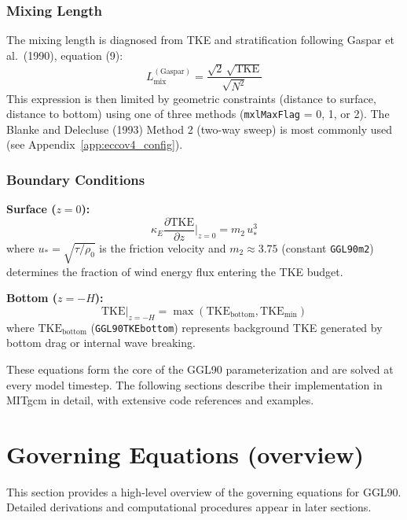 \documentclass[12pt,letterpaper]{article}
\newcommand{\TKE}{\mathrm{TKE}}
\newcommand{\KE}{\kappa_E}
\newcommand{\Lmix}{L_{\mathrm{mix}}}
\begin{document}
\subsubsection{Mixing Length}

The mixing length is diagnosed from TKE and stratification following Gaspar
et al.\ (1990), equation (9):
\begin{equation}
\Lmix^{\mathrm{(Gaspar)}} = \frac{\sqrt{2} \, \sqrt{\TKE}}{\sqrt{N^2}}
\label{eq:l_gaspar}
\end{equation}
This expression is then limited by geometric constraints (distance to surface,
distance to bottom) using one of three methods (\texttt{mxlMaxFlag} = 0, 1, or 2).
The Blanke and Delecluse (1993) Method 2 (two-way sweep) is most commonly used
(see Appendix~\ref{app:eccov4_config}).

\subsubsection{Boundary Conditions}

\textbf{Surface ($z = 0$):}
\begin{equation}
\KE \frac{\partial \TKE}{\partial z}\bigg|_{z=0} = m_2 \, u_*^3
\label{eq:bc_surface}
\end{equation}
where $u_* = \sqrt{\tau / \rho_0}$ is the friction velocity and $m_2 \approx
3.75$ (constant \texttt{GGL90m2}) determines the fraction of wind energy flux
entering the TKE budget.

\textbf{Bottom ($z = -H$):}
\begin{equation}
\TKE\big|_{z=-H} = \max(\TKE_{\mathrm{bottom}}, \TKE_{\mathrm{min}})
\label{eq:bc_bottom}
\end{equation}
where $\TKE_{\mathrm{bottom}}$ (\texttt{GGL90TKEbottom}) represents background
TKE generated by bottom drag or internal wave breaking.

These equations form the core of the GGL90 parameterization and are solved at
every model timestep. The following sections describe their implementation in
MITgcm in detail, with extensive code references and examples.

\section{Governing Equations (overview)}
\label{sec:governing_equations}

This section provides a high-level overview of the governing equations for GGL90. Detailed derivations and computational procedures appear in later sections.
\end{document}
